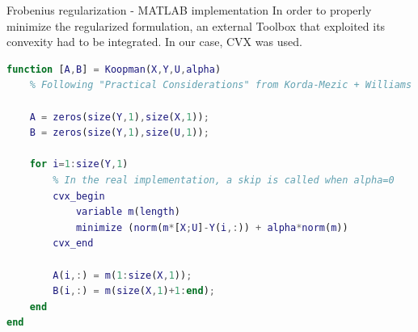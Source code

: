 \documentclass{beamer}
\begin{document}
\begin{frame}[fragile]{Frobenius regularization - MATLAB implementation}
    In order to properly minimize the regularized formulation, an external Toolbox that exploited its convexity had to be integrated. In our case, CVX was used.

    \begin{lstlisting}[language=Matlab,basicstyle=\tiny]
function [A,B] = Koopman(X,Y,U,alpha)
    % Following "Practical Considerations" from Korda-Mezic + Williams

    A = zeros(size(Y,1),size(X,1));
    B = zeros(size(Y,1),size(U,1));

    for i=1:size(Y,1)
        % In the real implementation, a skip is called when alpha=0
        cvx_begin
            variable m(length)
            minimize (norm(m*[X;U]-Y(i,:)) + alpha*norm(m))
        cvx_end

        A(i,:) = m(1:size(X,1));
        B(i,:) = m(size(X,1)+1:end);
    end
end
    \end{lstlisting}
\end{frame}
\end{document}
